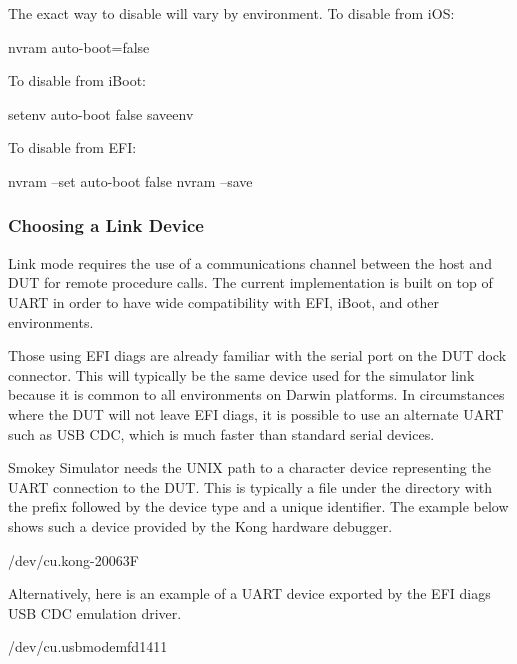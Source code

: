The exact way to disable  will vary by environment.  To
disable from iOS: 

\begin{CommandLine}
nvram auto-boot=false
\end{CommandLine}

To disable  from iBoot: 

\begin{CommandLine}
setenv auto-boot false
saveenv
\end{CommandLine}

To disable  from EFI:

\begin{CommandLine}
nvram --set auto-boot false
nvram --save
\end{CommandLine}

\subsubsection{Choosing a Link Device}
\label{sec:LinkDevice}

Link mode requires the use of a communications channel between the host and DUT
for remote procedure calls.  The current implementation is built on top of UART
in order to have wide compatibility with EFI, iBoot, and other environments.

Those using EFI diags are already familiar with the serial port on the DUT dock
connector.  This will typically be the same device used for the simulator link
because it is common to all environments on Darwin platforms.  In circumstances
where the DUT will not leave EFI diags, it is possible to use an alternate UART
such as USB CDC, which is much faster than standard serial devices.

Smokey Simulator needs the UNIX path to a character device representing the
UART connection to the DUT.  This is typically a file under the 
directory with the prefix  followed by the device type and a
unique identifier.  The example below shows such a device provided by the Kong
hardware debugger.

\begin{Setting}
/dev/cu.kong-20063F
\end{Setting}

Alternatively, here is an example of a UART device exported by the EFI diags
USB CDC emulation driver.

\begin{Setting}
/dev/cu.usbmodemfd1411
\end{Setting}

